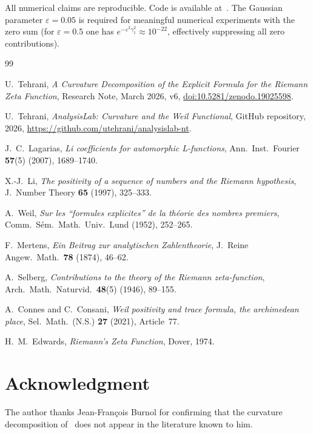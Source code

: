 \documentclass[11pt]{article}
\begin{document}
All numerical claims are reproducible. Code is available at~\cite{github}.
The Gaussian parameter $\varepsilon = 0.05$ is required for meaningful
numerical experiments with the zero sum (for $\varepsilon = 0.5$ one has
$e^{-\varepsilon^2\gamma_1^2} \approx 10^{-22}$, effectively
suppressing all zero contributions).

\begin{thebibliography}{99}

U.~Tehrani,
\emph{A Curvature Decomposition of the Explicit Formula
for the Riemann Zeta Function},
Research Note, March 2026, v6,
\href{https://doi.org/10.5281/zenodo.19025598}{%
doi:10.5281/zenodo.19025598}.

U.~Tehrani,
\emph{AnalysisLab: Curvature and the Weil Functional},
GitHub repository, 2026,
\url{https://github.com/utehrani/analysislab-nt}.

J.~C.~Lagarias,
\emph{Li coefficients for automorphic L-functions},
Ann.\ Inst.\ Fourier \textbf{57}(5) (2007), 1689--1740.

X.-J.~Li,
\emph{The positivity of a sequence of numbers
and the Riemann hypothesis},
J.\ Number Theory \textbf{65} (1997), 325--333.

A.~Weil,
\emph{Sur les ``formules explicites'' de la
th\'eorie des nombres premiers},
Comm.\ S\'em.\ Math.\ Univ.\ Lund (1952), 252--265.

F.~Mertens,
\emph{Ein Beitrag zur analytischen Zahlentheorie},
J.\ Reine Angew.\ Math.\ \textbf{78} (1874), 46--62.

A.~Selberg,
\emph{Contributions to the theory of the Riemann zeta-function},
Arch.\ Math.\ Naturvid.\ \textbf{48}(5) (1946), 89--155.

A.~Connes and C.~Consani,
\emph{Weil positivity and trace formula, the archimedean place},
Sel.\ Math.\ (N.S.) \textbf{27} (2021), Article~77.

H.~M.~Edwards,
\emph{Riemann's Zeta Function},
Dover, 1974.

\end{thebibliography}

\section*{Acknowledgment}

The author thanks Jean-Fran\c{c}ois Burnol for confirming that the
curvature decomposition of~\cite{paper1} does not appear in the
literature known to him.
\end{document}
